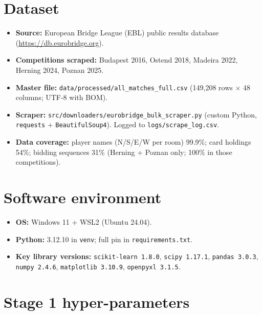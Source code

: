 \documentclass[11pt, a4paper, oneside, openany]{report}
\begin{document}
\section{Dataset}

\begin{itemize}[leftmargin=*]
    \item \textbf{Source:} European Bridge League (EBL) public results database (\url{https://db.eurobridge.org}).
    \item \textbf{Competitions scraped:} Budapest 2016, Ostend 2018, Madeira 2022, Herning 2024, Poznan 2025.
    \item \textbf{Master file:} \texttt{data/processed/all\_matches\_full.csv} (149{,}208 rows $\times$ 48 columns; UTF-8 with BOM).
    \item \textbf{Scraper:} \texttt{src/downloaders/eurobridge\_bulk\_scraper.py} (custom Python, \texttt{requests} + \texttt{BeautifulSoup4}). Logged to \texttt{logs/scrape\_log.csv}.
    \item \textbf{Data coverage:} player names (N/S/E/W per room) 99.9\%; card holdings 54\%; bidding sequences 31\% (Herning + Poznan only; 100\% in those competitions).
\end{itemize}

\section{Software environment}

\begin{itemize}[leftmargin=*]
    \item \textbf{OS:} Windows 11 + WSL2 (Ubuntu 24.04).
    \item \textbf{Python:} 3.12.10 in \texttt{venv}; full pin in \texttt{requirements.txt}.
    \item \textbf{Key library versions:} \texttt{scikit-learn 1.8.0}, \texttt{scipy 1.17.1}, \texttt{pandas 3.0.3}, \texttt{numpy 2.4.6}, \texttt{matplotlib 3.10.9}, \texttt{openpyxl 3.1.5}.
\end{itemize}

\section{Stage 1 hyper-parameters}
\end{document}
